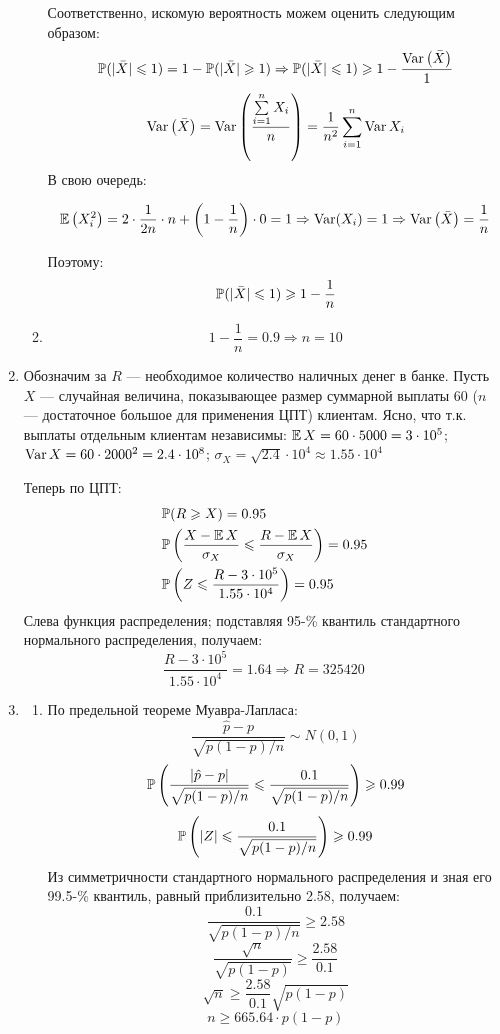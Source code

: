 \begin{enumerate}
\begin{enumerate}
Соответственно, искомую вероятность можем оценить следующим образом:
\[
\P(|\bar{X}| \leqslant 1) = 1 -\P(|\bar{X}| \geqslant 1) \Rightarrow \P(|\bar{X}| \leqslant 1) \geqslant 1 - \frac{\Var\left(\bar{X}\right)}{1}
\]
\[
\Var\left(\bar{X}\right) = \Var\left(\frac{\sum\limits_{i=1}^{n} X_i}{n}\right) = \frac{1}{n^2}\sum \limits_{i=1}^{n} \Var{X_i}
\]
В свою очередь:

\[
\E\left(X_i^2\right) = 2\cdot\frac{1}{2n}\cdot n + \left(1-\frac{1}{n}\right)\cdot0 = 1 \Rightarrow \Var(X_i) = 1 \Rightarrow \Var\left(\bar{X}\right) = \frac{1}{n}
\]

Поэтому:
\[
\P(|\bar{X}| \leqslant 1)\geqslant 1 - \frac{1}{n}
\]

\item  \[1 - \frac{1}{n} = 0.9  \Rightarrow n = 10\]

\end{enumerate}

\item

Обозначим за $R$ — необходимое количество наличных денег в банке. Пусть $X$ — случайная величина, показывающее размер суммарной выплаты $60$ ($n$ — достаточное большое для применения ЦПТ) клиентам. Ясно, что т.к. выплаты отдельным клиентам независимы: \( \E X = 60 \cdot 5000 = 3\cdot 10^5 \); \( \Var X = 60 \cdot 2000^2 = 2.4 \cdot 10^8 \); \( \sigma_X = \sqrt{2.4} \cdot 10^4 \approx 1.55 \cdot 10^4\)

Теперь по ЦПТ:
\begin{align*}
&\P(R \geqslant X) = 0.95 \\
&\P \left(\frac{X - \E X}{\sigma_X} \leqslant \frac{R - \E X}{\sigma_X} \right) = 0.95 \\
&\P \left( Z \leqslant \frac{R - 3 \cdot 10^5}{1.55 \cdot 10^4} \right) = 0.95
\end{align*}
Слева функция распределения; подставляя 95-\% квантиль стандартного нормального распределения, получаем:
\[
\frac{R - 3 \cdot 10^5}{1.55 \cdot 10^4} = 1.64 \Rightarrow R = 325420
\]


\item

\begin{enumerate}
\item По предельной теореме Муавра-Лапласа:
\[ \frac{\hat{p} - p}{\sqrt{p(1-p)/n}} \sim N (0,1) \]
\[ \P \left( \frac{|\hat{p} - p|}{\sqrt{p(1-p)/n}} \leqslant \frac{0.1}{\sqrt{p(1-p)/n}} \right) \geqslant 0.99 \]
\[ \P \left( |Z| \leqslant \frac{0.1}{\sqrt{p(1-p)/n}} \right) \geqslant 0.99 \]
Из симметричности стандартного нормального распределения и зная его 99.5-\% квантиль, равный приблизительно 2.58, получаем:
\[ \frac{0.1}{\sqrt{p(1-p)/n}} \geqslant 2.58 \]
\[ \frac{\sqrt{n}}{\sqrt{p(1-p)}} \geqslant \frac{2.58}{0.1} \]
\[ \sqrt{n} \geqslant \frac{2.58}{0.1} \sqrt{p(1-p)} \]
\[ n \geqslant 665.64 \cdot p(1-p) \]


\end{enumerate}
\end{enumerate}
